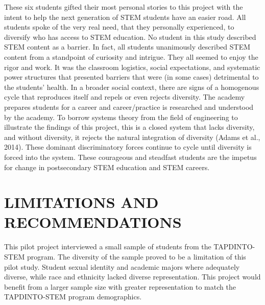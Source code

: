 \documentclass{sig-alternate} %
\begin{document}
\begin{large}
These six students gifted their most personal stories to this project with the intent to help the next generation of STEM students have an easier road. All students spoke of the very real need, that they personally experienced, to diversify who has access to STEM education. No student in this study described STEM content as a barrier. In fact, all students unanimously described STEM content from a standpoint of curiosity and intrigue. They all seemed to enjoy the rigor and work. It was the classroom logistics, social expectations, and systematic power structures that presented barriers that were (in some cases) detrimental to the students’ health. In a broader social context, there are signs of a homogenous cycle that reproduces itself and repels or even rejects diversity. The academy prepares students for a career and career/practice is researched and understood by the academy. To borrow systems theory from the field of engineering to illustrate the findings of this project, this is a closed system that lacks diversity, and without diversity, it rejects the natural integration of diversity (Adams et al., 2014). These dominant discriminatory forces continue to cycle until diversity is forced into the system. These courageous and steadfast students are the impetus for change in postsecondary STEM education and STEM careers.

\section*{LIMITATIONS AND RECOMMENDATIONS}

This pilot project interviewed a small sample of students from the TAPDINTO-STEM program. The diversity of the sample proved to be a limitation of this pilot study. Student sexual identity and academic majors where adequately diverse, while race and ethnicity lacked diverse representation. This project would benefit from a larger sample size with greater representation to match the TAPDINTO-STEM program demographics.


\end{large}
\end{document}

